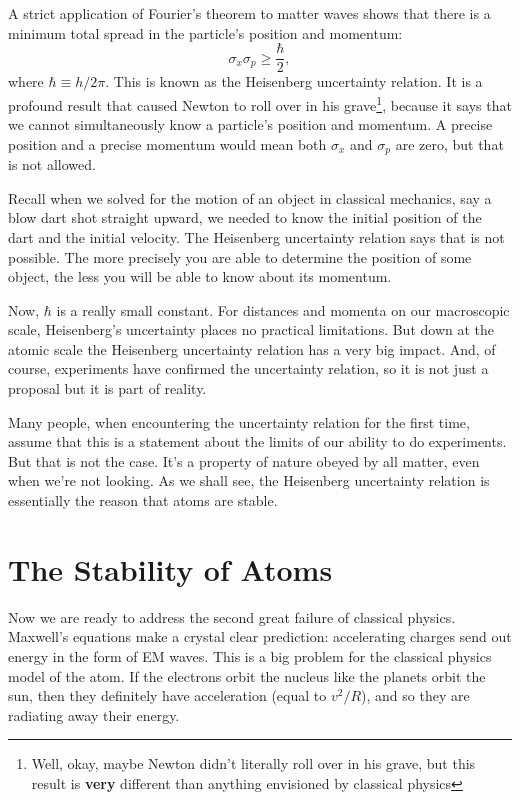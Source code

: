 A strict application of Fourier's theorem to matter waves shows that 
there is a minimum total spread in the particle's position and momentum:
\begin{equation}
  \sigma_x \sigma_p \geq \frac{\hbar}{2} ,
  \label{eq:heisenberg_uncertainty}
\end{equation}
where $\hbar \equiv h/2\pi$.
This is known as the Heisenberg uncertainty relation.  It is a profound
result that caused Newton to roll over in his grave\footnote{Well, okay,
maybe Newton didn't literally roll over in his grave, but this result
is {\bf very} different than anything envisioned by classical physics},
because it says that we cannot simultaneously know a particle's position
and momentum.  A precise position and a precise momentum would mean both
$\sigma_x$ and $\sigma_p$ are zero, but that is not allowed.

Recall when we solved for the motion of an object in classical
mechanics, say a blow dart shot straight upward, we needed to know
the initial position of the dart and the initial velocity.  The
Heisenberg uncertainty relation says that is not possible.  The
more precisely you are able to determine the position of some
object, the less you will be able to know about its momentum.

Now, $\hbar$ is a really small constant.  For distances and momenta on
our macroscopic scale, Heisenberg's uncertainty places no practical
limitations.  But down at the atomic scale the Heisenberg uncertainty
relation has a very big impact.  And, of course, experiments have
confirmed the uncertainty relation, so it is not just a proposal but
it is part of reality.

Many people, when encountering the uncertainty relation for the first
time, assume that this is a statement about the limits of our ability
to do experiments.  But that is not the case.  It's a property of
nature obeyed by all matter, even when we're not looking.  As we shall
see, the Heisenberg uncertainty relation is essentially the reason
that atoms are stable.

\section{The Stability of Atoms}
\label{sec:atom_stability}

Now we are ready to address the second great failure of classical physics.
Maxwell's equations make a crystal clear prediction: accelerating charges
send out energy in the form of EM waves.  This is a big problem for the
classical physics model of the atom.  If the electrons orbit the nucleus
like the planets orbit the sun, then they definitely have acceleration
(equal to $v^2/R$), and so they are radiating away their energy.

